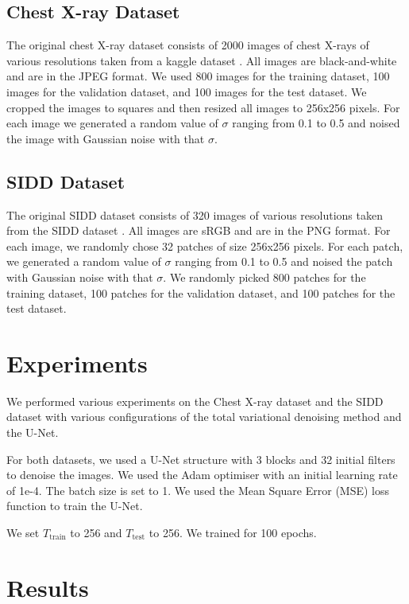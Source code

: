 \documentclass[12pt]{article}
\begin{document}
\subsection{Chest X-ray Dataset}

The original chest X-ray dataset consists of 2000 images of chest X-rays of various resolutions taken from a kaggle dataset \cite{kaggle}.
All images are black-and-white and are in the JPEG format.
We used 800 images for the training dataset, 100 images for the validation dataset, and 100 images for the test dataset.
We cropped the images to squares and then resized all images to 256x256 pixels.
For each image we generated a random value of $\sigma$ ranging from 0.1 to 0.5 and noised the image with Gaussian noise with that $\sigma$.

\subsection{SIDD Dataset}

The original SIDD dataset consists of 320 images of various resolutions taken from the SIDD dataset \cite{sidd}.
All images are sRGB and are in the PNG format.
For each image, we randomly chose 32 patches of size 256x256 pixels.
For each patch, we generated a random value of $\sigma$ ranging from 0.1 to 0.5 and noised the patch with Gaussian noise with that $\sigma$.
We randomly picked 800 patches for the training dataset, 100 patches for the validation dataset, and 100 patches for the test dataset.

\section{Experiments}

We performed various experiments on the Chest X-ray dataset and the SIDD dataset with various configurations of the total variational denoising method and the U-Net.

For both datasets, we used a U-Net structure with 3 blocks and 32 initial filters to denoise the images.
We used the Adam optimiser with an initial learning rate of 1e-4.
The batch size is set to 1.
We used the Mean Square Error (MSE) loss function to train the U-Net.

We set $T_{\text{train}}$ to 256 and $T_{\text{test}}$ to 256.
We trained for 100 epochs.



\section{Results}
\end{document}
